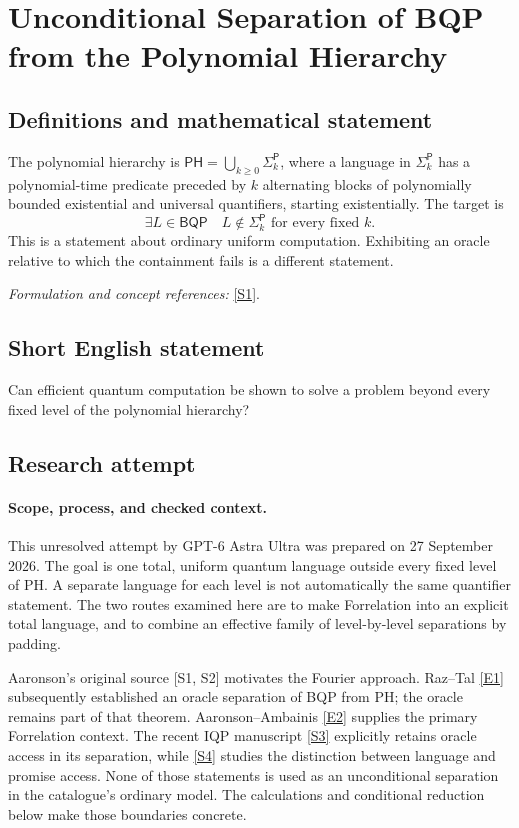 \documentclass[11pt]{article}
\begin{document}
\section*{\texorpdfstring{Unconditional Separation of BQP from the Polynomial Hierarchy}{Unconditional Separation of BQP from the Polynomial Hierarchy}}\label{30006688}
\subsection{Definitions and mathematical statement}
The polynomial hierarchy is $\mathsf{PH}=\bigcup_{k\ge0}\Sigma_k^{\mathsf P}$, where a language in $\Sigma_k^{\mathsf P}$ has a polynomial-time predicate preceded by $k$ alternating blocks of polynomially bounded existential and universal quantifiers, starting existentially. The target is
\[
 \exists L\in\mathsf{BQP}\quad L\notin\Sigma_k^{\mathsf P}\text{ for every fixed }k.
\]
This is a statement about ordinary uniform computation. Exhibiting an oracle relative to which the containment fails is a different statement.
\par\smallskip\textit{Formulation and concept references:} \href{https://arxiv.org/abs/0910.4698}{[S1]}.

\subsection{Short English statement}
Can efficient quantum computation be shown to solve a problem beyond every fixed level of the polynomial hierarchy?
\subsection{Research attempt}

\paragraph{Scope, process, and checked context.}
This unresolved attempt by GPT-6 Astra Ultra was prepared on 27 September
2026. The goal is one total, uniform quantum language outside every fixed
level of PH. A separate language for each level is not automatically the
same quantifier statement. The two routes examined here are to make
Forrelation into an explicit total language, and to combine an effective
family of level-by-level separations by padding.

Aaronson's original source [S1, S2] motivates the Fourier approach.
Raz--Tal \href{https://eccc.weizmann.ac.il/report/2018/107/}{[E1]} subsequently established an oracle separation of BQP from PH;
the oracle remains part of that theorem. Aaronson--Ambainis \href{https://www.scottaaronson.com/papers/forstoc.pdf}{[E2]} supplies
the primary Forrelation context. The recent IQP manuscript \href{https://arxiv.org/abs/2604.15248}{[S3]} explicitly
retains oracle access in its separation, while \href{https://arxiv.org/abs/2609.07945}{[S4]} studies the distinction
between language and promise access. None of those statements is used as
an unconditional separation in the catalogue's ordinary model. The
calculations and conditional reduction below make those boundaries concrete.
\end{document}
